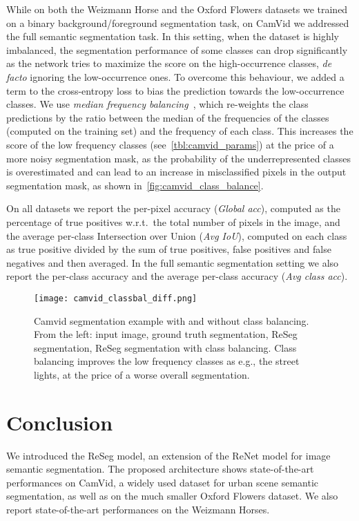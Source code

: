 \documentclass[times,art10,twocolumn,latex8]{article}
\begin{document}
While on both the Weizmann Horse and the Oxford Flowers datasets we trained on
a binary background/foreground segmentation task, on CamVid we addressed the
full semantic segmentation task. In this setting, when the dataset is highly
imbalanced, the segmentation performance of some classes can drop
significantly as the network tries to maximize the score on the high-occurrence
classes, {\em de facto} ignoring the low-occurrence ones. To overcome this behaviour,
we added a term to the cross-entropy loss to bias the prediction towards the
low-occurrence classes. We use \emph{median frequency
balancing}~\cite{Eigen2015}, which re-weights the class predictions by the
ratio between the median of the frequencies of the classes (computed on the
training set) and the frequency of each class.
This increases the score of the low frequency classes
(see~\autoref{tbl:camvid_params}) at the price of a more noisy segmentation
mask, as the probability of the underrepresented classes is overestimated and
can lead to an increase in misclassified pixels in the output segmentation
mask, as shown in~\autoref{fig:camvid_class_balance}.

On all datasets we report the per-pixel accuracy (\emph{Global acc}), computed
as the percentage of true positives w.r.t.\ the total number of pixels in the
image, and the average per-class Intersection over Union (\emph{Avg IoU}),
computed on each class as true positive divided by the sum of true positives,
false positives and false negatives and then averaged. In the full semantic
segmentation setting we also report the per-class accuracy and the average
per-class accuracy (\emph{Avg class acc}).

\begin{figure*}[!htb]
    \centering
\texttt{[image: camvid\_classbal\_diff.png]}\caption{Camvid segmentation example with and without class balancing. From
        the left: input image, ground truth segmentation, ReSeg segmentation,
        ReSeg segmentation with class balancing. Class balancing improves the
        low frequency classes as e.g., the street lights, at the price of a
        worse overall segmentation.}
    \label{fig:camvid_class_balance}
\end{figure*}

\section{Conclusion}
We introduced the ReSeg model, an extension of the ReNet model for image
semantic segmentation. The proposed architecture shows state-of-the-art
performances on CamVid, a widely used dataset for urban scene semantic
segmentation, as well as on the much smaller Oxford Flowers dataset. We also
report state-of-the-art performances on the Weizmann Horses.
\end{document}
